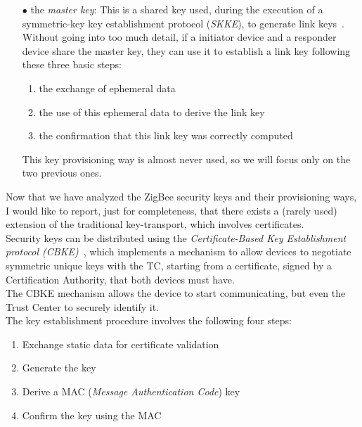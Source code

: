 \documentclass[12pt]{report}
\begin{document}
{\begin{itemize}
\item[$\bullet$] the \emph{master key}:  This is a shared key used, during the execution of a symmetric-key key establishment protocol (\emph{SKKE}), to generate link keys~\cite{zigbeespec}.\\
Without going into too much detail, if a initiator device and a responder device share the master key, they can use it to establish a link key following these three basic steps:

\begin{enumerate}
\item the exchange of ephemeral data
\item the use of this ephemeral data to derive the link key
\item the confirmation that this link key was correctly computed
\end{enumerate}
This key provisioning way is almost never used, so we will focus only on the two previous ones.

\end{itemize}

Now that we have analyzed the ZigBee security keys and their provisioning ways, I would like to report, just for completeness, that there exists a (rarely used) extension of the traditional key-transport, which involves certificates.\\
Security keys can be distributed using the \emph{Certificate-Based Key Establishment protocol (CBKE)}~\cite{zigbeesecbasics2}, which implements a mechanism to allow devices to negotiate symmetric unique keys with the TC, starting from a certificate, signed by a Certification Authority, that both devices must have.\\
The CBKE mechanism allows the device to start communicating, but even the Trust Center to securely identify it.\\
The key establishment procedure involves the following four steps:

\begin{enumerate}
\setlength{\itemindent}{+5mm}
\item Exchange static data for certificate validation
\item Generate the key
\item Derive a MAC (\emph{Message Authentication Code}) key
\item Confirm the key using the MAC
 \end{enumerate}

}
\end{document}
